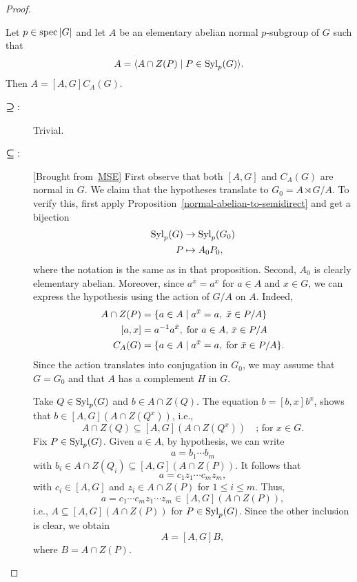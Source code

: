 \begin{proof}
\begin{exr}
    Let\/ $p \in \operatorname{spec}|G|$ and\/ let $A$ be an elementary abelian normal\/ $p$-subgroup of\/ $G$ such that
    $$
        A = \langle A\cap Z(P)\mid P\in{\rm Syl}_p(G)\rangle.
    $$
    Then\/ $A=[A,G]C_A(G)$.
\end{exr}

\begin{solution}
\begin{description}
    \item[$\textrm{\boldmath$\supseteq$}:$] Trivial.
    \item[$\textrm{\boldmath$\subseteq$}:$] {[Brought from~\href{https://math.stackexchange.com/a/1525723/269050}{MSE}]} First observe that both $[A,G]$ and $C_A(G)$ are normal in $G$. We claim that the hypotheses translate to $G_0=A\rtimes G/A$. To verify this, first apply Proposition~\ref{normal-abelian-to-semidirect} and get a bijection
    \begin{align*}
        {\rm Syl}_p(G) &\to {\rm Syl}_p(G_0)\\
        P&\mapsto A_0P_0,
    \end{align*}
    where the notation is the same as in that proposition. Second, $A_0$ is clearly elementary abelian. Moreover, since $a^{\bar x}=a^x$ for $a\in A$ and $x\in G$, we can express the hypothesis using the action of $G/A$ on $A$. Indeed,
    \begin{align*}
        A\cap Z(P) &= \{a\in A\mid a^{\bar x}=a,\;\bar x\in P/A\}\\
        [a,x] &= a^{-1}a^{\bar x},\;\text{for }a\in A,\,\bar x\in P/A\\
        C_A(G) &= \{a\in A\mid a^{\bar x}=a,\;\text{for }\bar x\in P/A\}.
    \end{align*}
    Since the action translates into conjugation in $G_0$, we may assume that $G=G_0$ and that $A$ has a complement $H$ in $G$.
    
    Take $Q\in{\rm Syl}_p(G)$ and $b\in A\cap Z(Q)$. The equation $b=[b,x]b^x$, shows that $b\in[A,G](A\cap Z(Q^x))$, i.e.,
    $$
        A\cap Z(Q)\subseteq[A,G](A\cap Z(Q^x))\quad\text{; for }x\in G.
    $$
    Fix $P\in{\rm Syl}_p(G)$. Given $a\in A$, by hypothesis, we can write
    $$
        a = b_1\cdots b_m
    $$
    with $b_i\in A\cap Z(Q_i)\subseteq[A,G](A\cap Z(P))$. It follows that
    $$
        a = c_1z_1\cdots c_mz_m,
    $$
    with $c_i\in[A,G]$ and $z_i\in A\cap Z(P)$ for $1\le i\le m$. Thus,
    $$
        a = c_1\cdots c_mz_1\cdots z_m\in[A,G](A\cap Z(P)),
    $$
    i.e., $A\subseteq[A,G](A\cap Z(P))$ for $P\in{\rm Syl}_p(G)$. Since the other inclusion is clear, we obtain
    $$
        A = [A,G]B,
    $$
    where $B=A\cap Z(P)$.
    

\end{description}
\end{solution}
\end{proof}
